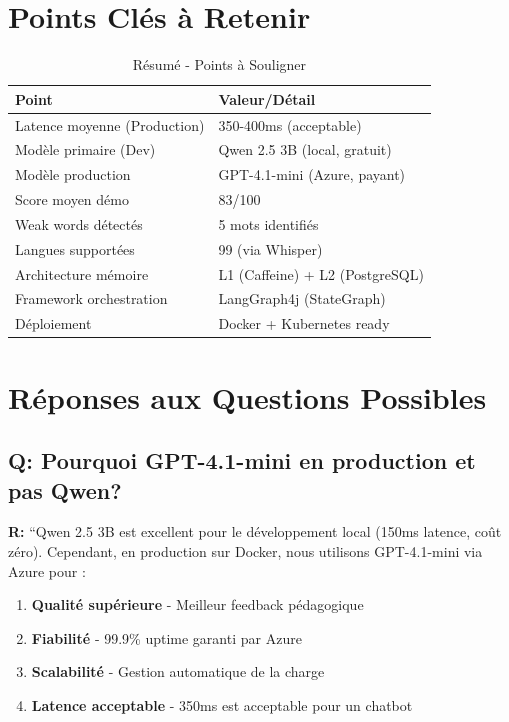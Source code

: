 \documentclass[12pt,a4paper,oneside]{report}
\begin{document}
\section{Points Clés à Retenir}

\begin{table}[H]
\centering
\caption{Résumé - Points à Souligner}
\label{tab:key_points}
\begin{tabular}{|l|l|}
\hline
\textbf{Point} & \textbf{Valeur/Détail} \\
\hline
Latence moyenne (Production) & 350-400ms (acceptable) \\
\hline
Modèle primaire (Dev) & Qwen 2.5 3B (local, gratuit) \\
\hline
Modèle production & GPT-4.1-mini (Azure, payant) \\
\hline
Score moyen démo & 83/100 \\
\hline
Weak words détectés & 5 mots identifiés \\
\hline
Langues supportées & 99 (via Whisper) \\
\hline
Architecture mémoire & L1 (Caffeine) + L2 (PostgreSQL) \\
\hline
Framework orchestration & LangGraph4j (StateGraph) \\
\hline
Déploiement & Docker + Kubernetes ready \\
\hline
\end{tabular}
\end{table}

\section{Réponses aux Questions Possibles}

\subsection{Q: Pourquoi GPT-4.1-mini en production et pas Qwen?}

\textbf{R:} ``Qwen 2.5 3B est excellent pour le développement local (150ms latence, coût zéro). 
Cependant, en production sur Docker, nous utilisons GPT-4.1-mini via Azure pour :
\begin{enumerate}
    \item \textbf{Qualité supérieure} - Meilleur feedback pédagogique
    \item \textbf{Fiabilité} - 99.9\% uptime garanti par Azure
    \item \textbf{Scalabilité} - Gestion automatique de la charge
    \item \textbf{Latence acceptable} - 350ms est acceptable pour un chatbot
\end{enumerate}
\end{document}
